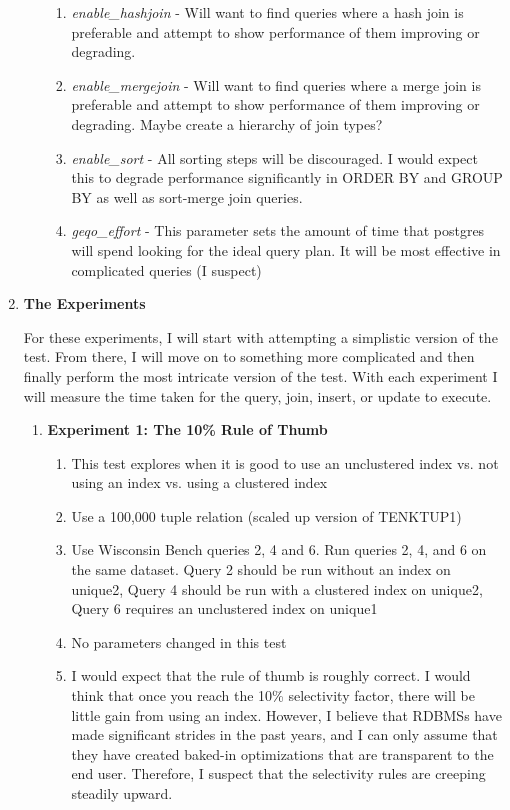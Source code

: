 \documentclass[11pt,letterpaper]{article}
\begin{document}
\begin{enumerate}
\begin{enumerate}{}
	\begin{enumerate}
		\item \textit{enable\_hashjoin} - Will want to find queries where a hash join is preferable and attempt to show performance of them improving or degrading.
		\item \textit{enable\_mergejoin} - Will want to find queries where a merge join is preferable and attempt to show performance of them improving or degrading.  Maybe create a hierarchy of join types?
		\item \textit{enable\_sort } - All sorting steps will be discouraged.  I would expect this to degrade performance significantly in ORDER BY and GROUP BY as well as sort-merge join queries.
		\item \textit{geqo\_effort} - This parameter sets the amount of time that postgres will spend looking for the ideal query plan.  It will be most effective in complicated queries (I suspect)
	\end{enumerate}

\end{enumerate}	

\item \textbf{The Experiments}

For these experiments, I will start with attempting a simplistic version of the test.  From there, I will move on to something more complicated and then finally perform the most intricate version of the test.  With each experiment I will measure the time taken for the query, join, insert, or update to execute.

\begin{enumerate}
	
	\item \textbf{Experiment 1: The 10\% Rule of Thumb}
	
	\begin{enumerate}
		
		\item This test explores when it is good to use an unclustered index vs. not using an index vs. using a clustered index
		\item Use a 100,000 tuple relation (scaled up version of TENKTUP1)
		\item Use Wisconsin Bench queries 2, 4 and 6. Run queries 2, 4, and 6 on the same dataset. Query 2 should be run without an index on unique2, Query 4 should be run with a clustered index on unique2, Query 6 requires an unclustered index on unique1
		\item No parameters changed in this test
		\item I would expect that the rule of thumb is roughly correct.  I would think that once you reach the 10\% selectivity factor, there will be little gain from using an index.  However, I believe that RDBMSs have made significant strides in the past years, and I can only assume that they have created baked-in optimizations that are transparent to the end user.  Therefore, I suspect that the selectivity rules are creeping steadily upward.
		

\end{enumerate}
\end{enumerate}
\end{enumerate}
\end{document}
